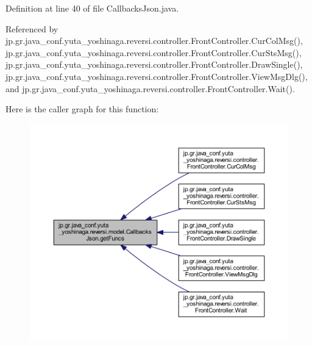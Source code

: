 Definition at line 40 of file Callbacks\+Json.\+java.



Referenced by jp.\+gr.\+java\+\_\+conf.\+yuta\+\_\+yoshinaga.\+reversi.\+controller.\+Front\+Controller.\+Cur\+Col\+Msg(), jp.\+gr.\+java\+\_\+conf.\+yuta\+\_\+yoshinaga.\+reversi.\+controller.\+Front\+Controller.\+Cur\+Sts\+Msg(), jp.\+gr.\+java\+\_\+conf.\+yuta\+\_\+yoshinaga.\+reversi.\+controller.\+Front\+Controller.\+Draw\+Single(), jp.\+gr.\+java\+\_\+conf.\+yuta\+\_\+yoshinaga.\+reversi.\+controller.\+Front\+Controller.\+View\+Msg\+Dlg(), and jp.\+gr.\+java\+\_\+conf.\+yuta\+\_\+yoshinaga.\+reversi.\+controller.\+Front\+Controller.\+Wait().

Here is the caller graph for this function\+:
\nopagebreak
\begin{figure}[H]
\begin{center}
\leavevmode
\includegraphics[width=350pt]{classjp_1_1gr_1_1java__conf_1_1yuta__yoshinaga_1_1reversi_1_1model_1_1_callbacks_json_af9a62a3dbe6416793c01d7a0f69da2b1_icgraph}
\end{center}
\end{figure}
\mbox{\label{classjp_1_1gr_1_1java__conf_1_1yuta__yoshinaga_1_1reversi_1_1model_1_1_callbacks_json_a6de1fc00c131167b4fe6231a660bdb6e}} 
